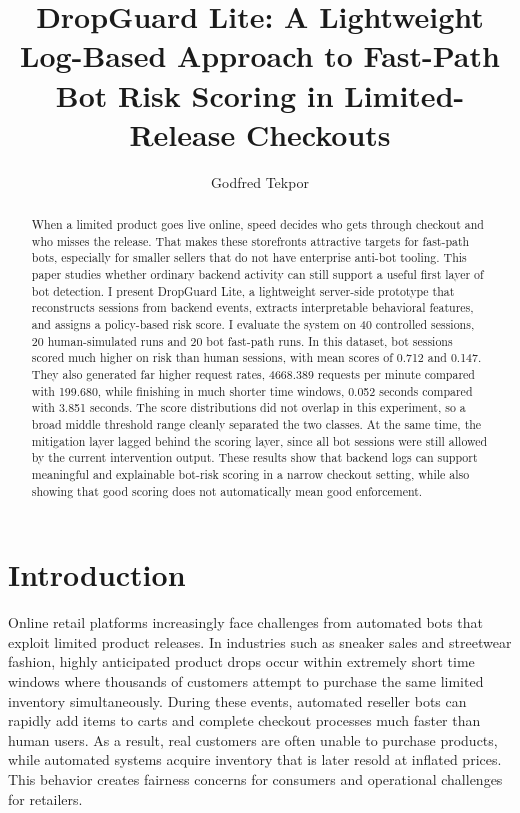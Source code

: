 \documentclass[12pt]{article}
\title{\textbf{DropGuard Lite: A Lightweight Log-Based Approach to Fast-Path Bot Risk Scoring in Limited-Release Checkouts}}
\author{Godfred Tekpor}
\begin{document}
\maketitle

\begin{abstract}
When a limited product goes live online, speed decides who gets through checkout and who misses the release. That makes these storefronts attractive targets for fast-path bots, especially for smaller sellers that do not have enterprise anti-bot tooling. This paper studies whether ordinary backend activity can still support a useful first layer of bot detection. I present DropGuard Lite, a lightweight server-side prototype that reconstructs sessions from backend events, extracts interpretable behavioral features, and assigns a policy-based risk score. I evaluate the system on 40 controlled sessions, 20 human-simulated runs and 20 bot fast-path runs. In this dataset, bot sessions scored much higher on risk than human sessions, with mean scores of 0.712 and 0.147. They also generated far higher request rates, 4668.389 requests per minute compared with 199.680, while finishing in much shorter time windows, 0.052 seconds compared with 3.851 seconds. The score distributions did not overlap in this experiment, so a broad middle threshold range cleanly separated the two classes. At the same time, the mitigation layer lagged behind the scoring layer, since all bot sessions were still allowed by the current intervention output. These results show that backend logs can support meaningful and explainable bot-risk scoring in a narrow checkout setting, while also showing that good scoring does not automatically mean good enforcement.
\end{abstract}

\section{Introduction}
Online retail platforms increasingly face challenges from automated bots that exploit limited product releases. In industries such as sneaker sales and streetwear fashion, highly anticipated product drops occur within extremely short time windows where thousands of customers attempt to purchase the same limited inventory simultaneously. During these events, automated reseller bots can rapidly add items to carts and complete checkout processes much faster than human users. As a result, real customers are often unable to purchase products, while automated systems acquire inventory that is later resold at inflated prices. This behavior creates fairness concerns for consumers and operational challenges for retailers.
\end{document}
